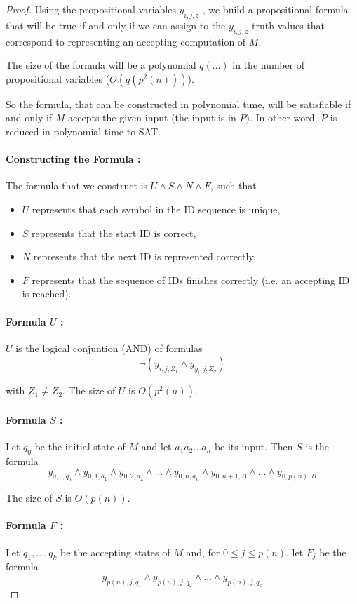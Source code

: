 \documentclass[a4paper,11pt]{report}
\begin{document}
\begin{proof}
  Using the propositional variables $y_{i,j,z}$ , we build a propositional formula
  that will be true if and only if we can assign to the $y_{i,j,z}$ truth values
  that correspond to representing an accepting computation of $M$.

  The size of the formula will be a polynomial $q(\dots)$ in the number of
  propositional variables ($O(q(p^2(n)))$).

  So the formula, that can be constructed in polynomial time, will be
  satisfiable if and only if $M$ accepts the given input (the input is in $P$).
  In other word, $P$ is reduced in polynomial time to SAT.

  \paragraph{Constructing the Formula :} The formula that we construct is $U
  \wedge S \wedge N \wedge F$, such that
  \begin{itemize}
  \item $U$ represents that each symbol in the ID sequence is unique,
  \item $S$ represents that the start ID is correct,
  \item $N$ represents that the next ID is represented correctly,
  \item $F$ represents that the sequence of IDs finishes correctly (i.e. an
    accepting ID is reached).
  \end{itemize}

  \paragraph{Formula $U$ : } $U$ is the logical conjuntion (AND) of formulas
  \[
    \neg(y_{i,j,Z_1} \wedge y_{y_i,j,Z_2})
  \]

  with $Z_1 \neq Z_2$. The size of $U$ is $O(p^2(n))$.

  \paragraph{Formula $S$ : } Let $q_0$ be the initial state of $M$ and let
  $a_1a_2\dots a_n$ be its input. Then $S$ is the formula
  \[
    y_{0,0,q_0} \wedge y_{0,1,a_1} \wedge y_{0,2,a_2} \wedge \dots \wedge
    y_{0,n,a_n} \wedge y_{0,n+1,B} \wedge \dots \wedge y_{0,p(n),B}
  \]

  The size of $S$ is $O(p(n))$.

  \paragraph{Formula $F$ : } Let $q_1,\dots,q_k$ be the accepting states of $M$
  and, for $0 \leq j \leq p(n)$, let $F_j$ be the formula
  \[
    y_{p(n),j,q_1} \wedge y_{p(n),j,q_2} \wedge \dots \wedge y_{p(n),j,q_k}
  \]


\end{proof}
\end{document}
